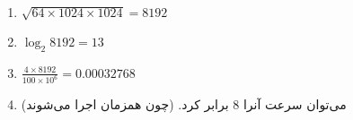 \begin{enumerate}[leftmargin=0cm,itemindent=.5cm,label=\alph*.]
    \item $\sqrt{64 \times 1024 \times 1024} = 8192$
    \item $\log_2 8192 = 13$
    \item $\frac{4 \times 8192}{100 \times 10^6} = 0.00032768$
    \item می‌توان سرعت آنرا 8 برابر کرد. (چون همزمان اجرا می‌شوند)
\end{enumerate}

